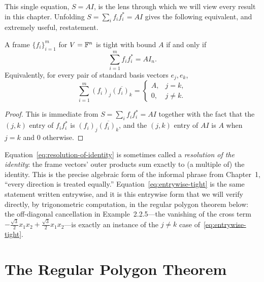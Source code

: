 This single equation, $S = AI$, is the lens through which we will view
every result in this chapter. Unfolding $S = \sum_i f_if_i^* = AI$ gives
the following equivalent, and extremely useful, restatement.

\begin{proposition}
\label{prop:tightness-resolution}
A frame $\{f_i\}_{i=1}^m$ for $V=\mathbb{F}^n$ is tight with bound $A$ if and
only if
\begin{equation}
\label{eq:resolution-of-identity}
  \sum_{i=1}^m f_i f_i^* = A I_n.
\end{equation}
Equivalently, for every pair of standard basis vectors $e_j, e_k$,
\begin{equation}
\label{eq:entrywise-tight}
  \sum_{i=1}^m (f_i)_j \overline{(f_i)_k} =
  \begin{cases} A, & j = k, \\ 0, & j \ne k. \end{cases}
\end{equation}
\end{proposition}

\begin{proof}
This is immediate from $S = \sum_i f_if_i^* = AI$ together with the fact
that the $(j,k)$ entry of $f_if_i^*$ is $(f_i)_j\overline{(f_i)_k}$, and
the $(j,k)$ entry of $AI$ is $A$ when $j=k$ and $0$ otherwise.
\end{proof}

\begin{remark*}
Equation~\eqref{eq:resolution-of-identity} is sometimes called a
\emph{resolution of the identity}: the frame vectors' outer products sum
exactly to (a multiple of) the identity. This is the precise algebraic
form of the informal phrase from Chapter~1, ``every direction is treated
equally.'' Equation~\eqref{eq:entrywise-tight} is the same statement
written entrywise, and it is this entrywise form that we will verify
directly, by trigonometric computation, in the regular polygon theorem
below: the off-diagonal cancellation in
Example~2.2.5---the vanishing of the cross term
$-\tfrac{\sqrt3}{2}x_1x_2+\tfrac{\sqrt3}{2}x_1x_2$---is exactly an
instance of the $j\ne k$ case of~\eqref{eq:entrywise-tight}.
\end{remark*}

\section{The Regular Polygon Theorem}
\label{sec:regular-polygon}

